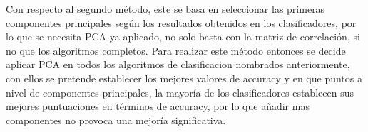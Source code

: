 Con respecto al segundo método, este se basa en seleccionar las primeras componentes principales según los resultados obtenidos en los clasificadores, por lo que se necesita PCA ya aplicado, no solo basta con la matriz de correlación, si no que los algoritmos completos. Para realizar este método entonces se decide aplicar PCA en todos los algoritmos de clasificacion nombrados anteriormente, con ellos se pretende establecer los mejores valores de accuracy y en que puntos a nivel de componentes principales, la mayoría de los clasificadores establecen sus mejores puntuaciones en términos de accuracy, por lo que añadir mas componentes no provoca una mejoría significativa.


